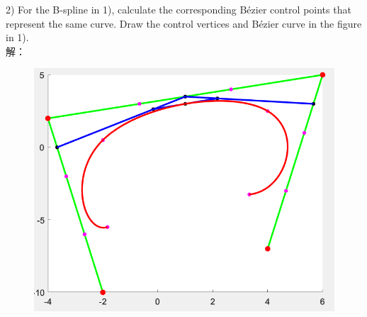 \documentclass{article}
\begin{document}
	2) For the B-spline in 1), calculate the corresponding Bézier control points that 
	represent the same curve. Draw the control vertices and Bézier curve in the figure 
	in 1).\\
	解：\\
	\begin{figure}[H]
		\centering
		\includegraphics{3}
		\caption{}
		\label{fig:3}
	\end{figure}
	
\end{document}
